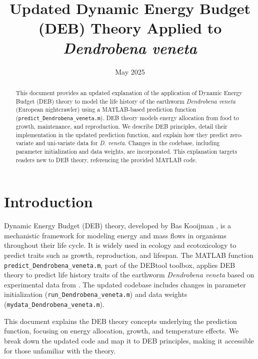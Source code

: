 \documentclass[11pt]{article}
\title{Updated Dynamic Energy Budget (DEB) Theory Applied to \textit{Dendrobena veneta}}
\author{}
\date{May 2025}
\begin{document}
\maketitle

\begin{abstract}
This document provides an updated explanation of the application of Dynamic Energy Budget (DEB) theory to model the life history of the earthworm \textit{Dendrobena veneta} (European nightcrawler) using a MATLAB-based prediction function (\texttt{predict\_Dendrobena\_veneta.m}). DEB theory models energy allocation from food to growth, maintenance, and reproduction. We describe DEB principles, detail their implementation in the updated prediction function, and explain how they predict zero-variate and uni-variate data for \textit{D. veneta}. Changes in the codebase, including parameter initialization and data weights, are incorporated. This explanation targets readers new to DEB theory, referencing the provided MATLAB code.
\end{abstract}

\section{Introduction}
Dynamic Energy Budget (DEB) theory, developed by Bas Kooijman \citep{Kooijman2010}, is a mechanistic framework for modeling energy and mass flows in organisms throughout their life cycle. It is widely used in ecology and ecotoxicology to predict traits such as growth, reproduction, and lifespan. The MATLAB function \texttt{predict\_Dendrobena\_veneta.m}, part of the DEBtool toolbox, applies DEB theory to predict life history traits of the earthworm \textit{Dendrobena veneta} based on experimental data from \citet{Viljoen1991, Viljoen1992, Kovacevic2023, Podolak2020}. The updated codebase includes changes in parameter initialization (\texttt{run\_Dendrobena\_veneta.m}) and data weights (\texttt{mydata\_Dendrobena\_veneta.m}).

This document explains the DEB theory concepts underlying the prediction function, focusing on energy allocation, growth, and temperature effects. We break down the updated code and map it to DEB principles, making it accessible for those unfamiliar with the theory.
\end{document}
